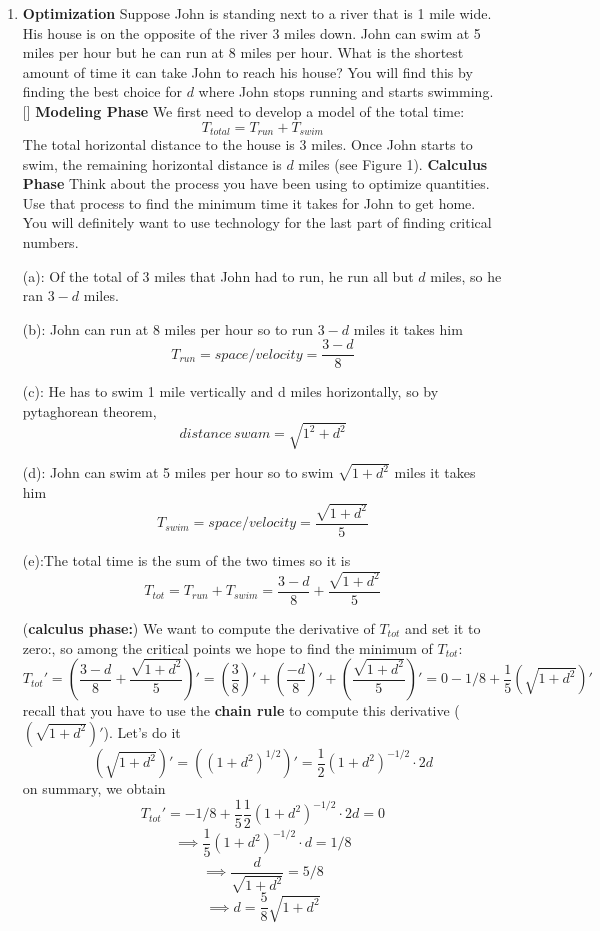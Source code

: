 \documentclass[10pt]{article}
\begin{document}
\begin{enumerate}
\newpage
\item {\bf Optimization} Suppose John is standing next to a river that is 1 mile wide. His house is on the opposite of the river 3 miles down. John can swim at 5 miles per hour but he can run at 8 miles per hour. What is the shortest amount of time it can take John to reach his house? You will find this by finding the best choice for $d$ where John stops running and starts swimming.\\
[]{
{\bf Modeling Phase} We first need to develop a model of the total time: $$T_{total}=T_{run}+T_{swim}$$
The total horizontal distance to the house is $3$ miles.  Once John starts to swim, the remaining horizontal distance is $d$ miles (see Figure 1). 
}{
}
{\bf Calculus Phase} Think about the process you have been using to optimize quantities. Use that process to find the minimum time it takes for John to get home. You will definitely want to use technology for the last part of finding critical numbers.

(a): Of the total of 3 miles that John had to run, he run all but $d$ miles, so he ran $3-d$ miles.

(b): John can run at 8 miles per hour so to run $3-d$ miles it takes him
\[
T_{run}=space/velocity=\frac{3-d}{8}
\]


(c): He has to swim 1 mile vertically and d miles horizontally, so by pytaghorean theorem,
\[
distance \, swam= \sqrt{1^2+d^2}
\]

(d): John can swim at 5 miles per hour so to swim $ \sqrt{1+d^2}$ miles it takes him
\[
T_{swim}=space/velocity=\frac{ \sqrt{1+d^2}}{5}
\]

(e):The total time is the sum of the two times so it is
\[
T_{tot}=T_{run}+T_{swim}=\frac{3-d}{8}+\frac{ \sqrt{1+d^2}}{5}
\]


({\bf calculus phase:}) We want to compute the derivative of $T_{tot}$ and set it to zero:, so among the critical points we hope to find the minimum of $T_{tot}$: 
\[
T_{tot}'=(\frac{3-d}{8}+\frac{ \sqrt{1+d^2}}{5})'=(\frac{3}{8})'+(\frac{-d}{8})'+(\frac{\sqrt{1+d^2}}{5})'=0-1/8+\frac{1}{5}(\sqrt{1+d^2})'
\]
recall that you have to use the {\bf chain rule} to compute this derivative ($(\sqrt{1+d^2})'$). Let's do it
\[
(\sqrt{1+d^2})'=((1+d^2)^{1/2})'=\frac{1}{2}(1+d^2)^{-1/2} \cdot 2d
\]
on summary, we obtain
\[
T_{tot}'=-1/8+\frac{1}{5}\frac{1}{2}(1+d^2)^{-1/2} \cdot 2d=0
\]
\[
\implies \frac{1}{5}(1+d^2)^{-1/2} \cdot d=1/8
\]
\[
\implies \frac{d}{\sqrt{1+d^2}}=5/8
\]
\[
\implies d=\frac{5}{8}\sqrt{1+d^2}
\]


\end{enumerate}
\end{document}
